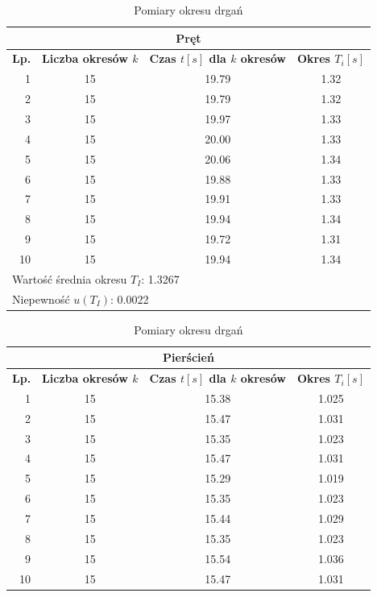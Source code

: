 \documentclass{fizraport}
\begin{document}
\begin{table}[th]
\caption{Pomiary okresu drgań}
\newlength{\colW}
\setlength{\colW}{1.45cm}
\centering
\begin{tabular}{|r|c|c|c|}
\hline
\multicolumn{4}{|c|}{Pręt} \\ \hline
\multirow[t]{3}{0.5\colW}{\centering\textbf{Lp.}}&
\multirow[t]{3}{\colW}{\centering \textbf{Liczba okresów $k$}}&
\multirow[t]{3}{1.5\colW}{\centering\textbf{ Czas $t[s]$ dla $k$ okresów}}&
\multirow[t]{3}{\colW}{\centering\textbf{Okres $T_i[s]$}}\\
&&&\\&&&\\\hline
1 & 15 & 19.79 & 1.32 \\ \hline
2& 15 & 19.79 & 1.32 \\ \hline
3& 15 & 19.97 & 1.33 \\ \hline
4& 15 & 20.00 & 1.33 \\ \hline
5 & 15 & 20.06 & 1.34 \\ \hline
6& 15 & 19.88 & 1.33 \\ \hline
7& 15 & 19.91 & 1.33 \\ \hline
8& 15 & 19.94 & 1.34 \\ \hline
9& 15 & 19.72 & 1.31 \\ \hline
10& 15 & 19.94 & 1.34 \\ \hline


\multicolumn{4}{|l|}{Wartość średnia okresu $T_I$:   1.3267 } \\ \hline
\multicolumn{4}{|l|}{Niepewność $u(T_I)$:  0.0022 } \\ \hline
\end{tabular}
\quad
\begin{tabular}{|r|c|c|c|}
\hline
\multicolumn{4}{|c|}{Pierścień} \\ \hline
\multirow[t]{3}{0.5\colW}{\centering\textbf{Lp.}}&
\multirow[t]{3}{\colW}{\centering \textbf{Liczba okresów $k$}}&
\multirow[t]{3}{1.5\colW}{\centering\textbf{ Czas $t[s]$ dla $k$ okresów}}&
\multirow[t]{3}{\colW}{\centering\textbf{Okres $T_i[s]$}}\\
&&&\\&&&\\\hline
1 & 15 & 15.38 & 1.025 \\ \hline
2& 15 & 15.47 & 1.031 \\ \hline
3& 15 & 15.35 & 1.023 \\ \hline
4& 15 & 15.47 & 1.031 \\ \hline
5 & 15 & 15.29 & 1.019 \\ \hline
6& 15 & 15.35 & 1.023 \\ \hline
7& 15 & 15.44 & 1.029 \\ \hline
8& 15 & 15.35 & 1.023 \\ \hline
9& 15 & 15.54 & 1.036 \\ \hline
10& 15 & 15.47 & 1.031 \\ \hline


\end{tabular}
\end{table}
\end{document}
